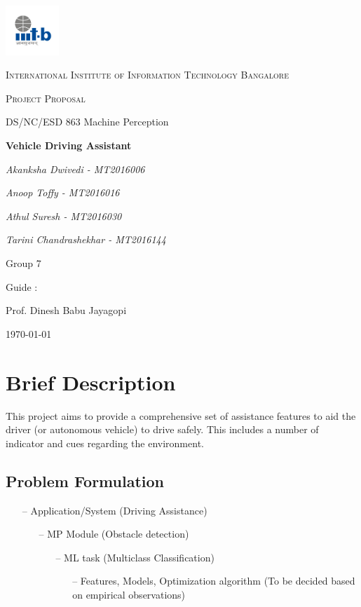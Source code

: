 \documentclass[12pt,a4paper]{article}
\begin{document}
\begin{titlepage}
	\centering
	\includegraphics[width=0.15\textwidth]{IIIT-B_logo.jpg}\par\vspace{1cm}
	{\scshape\LARGE International Institute of Information Technology Bangalore \par}
	\vspace{1cm}
	{\scshape\Large Project Proposal\par}
	{\Large DS/NC/ESD 863 Machine Perception\par}
	\vspace{1.5cm}
	{\huge\bfseries Vehicle Driving Assistant \par}
	\vspace{2cm}	   
	{\Large\itshape Akanksha Dwivedi - MT2016006\par}
	{\Large\itshape Anoop Toffy - MT2016016\par}
	{\Large\itshape Athul Suresh - MT2016030\par}
	{\Large\itshape Tarini Chandrashekhar - MT2016144\par}
	\vfill
	{\huge Group 7 \par}
	\vfill
	Guide : \par
	Prof. Dinesh Babu Jayagopi 

	\vfill

	{\large \today\par}
\end{titlepage}


\tableofcontents
\newpage

\section{Brief Description}
This project aims to provide a comprehensive set of assistance features to aid the driver (or autonomous vehicle) to drive safely. This includes a number of indicator and cues regarding the environment.  
\vspace*{1cm}
\subsection{Problem Formulation}
\begin{itemize}
\item[--] Application/System (Driving Assistance)
	\begin{itemize}
	\item[--] MP Module (Obstacle detection)
	\begin{itemize}
	\item[--] ML task (Multiclass Classification)
	\begin{itemize}
		\item[--] Features, Models, Optimization algorithm (To be decided based on empirical observations)
		\end{itemize}
	\end{itemize}
\end{itemize}						
\end{itemize}
\newpage
\end{document}
